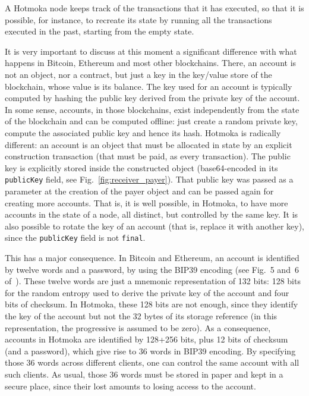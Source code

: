 A Hotmoka node keeps track
of the transactions that it has executed, so that it is possible, for instance,
to recreate its state by running all the transactions executed in the past, starting from
the empty state.

It is very important to discuss at this moment a significant difference with what
happens in Bitcoin, Ethereum and most other blockchains. There, an account
is not an object, nor a contract,
but just a key in the key/value store of the blockchain, whose value is its balance.
The key used for an account is typically computed by hashing the public key derived from
the private key of the account. In some sense, accounts, in those blockchains, exist
independently from the state of the blockchain and can be computed offline: just
create a random private key, compute the associated public key and hence its hash.
Hotmoka is radically different: an account is an object that must be allocated in
state by an explicit construction transaction (that must be paid, as every transaction).
The public key is explicitly stored inside the constructed object
(base64-encoded in its \texttt{publicKey} field, see Fig.~\ref{fig:receiver_payer}).
That public key was passed as a parameter at the creation of the payer object and
can be passed again for creating more accounts. That is, it is well possible, in Hotmoka,
to have more accounts in the state of a node, all distinct, but controlled by the same key.
It is also possible to rotate the key of an account
(that is, replace it with another key), since the
\texttt{publicKey} field is not \texttt{final}.

This has a major consequence. In Bitcoin and Ethereum, an account is identified by
twelve words and a password, by using the BIP39 encoding
(see Fig.~5 and~6 of~\cite{Antonopoulos23}). These twelve words are just
a mnemonic representation of 132 bits: 128 bits for the random entropy used to derive the
private key of the account and four bits of checksum. In Hotmoka, these 128 bits are
not enough, since they identify the key of the account but not the 32 bytes of its
storage reference (in this representation, the progressive is assumed to be zero).
As a consequence, accounts in Hotmoka are identified by
128+256 bits, plus 12 bits of checksum (and a password),
which give rise to 36 words in BIP39 encoding.
By specifying those 36 words across different clients, one can control the
same account with all such clients. As usual, those 36 words must be stored in paper
and kept in a secure place, since their lost amounts to losing access to the account.

